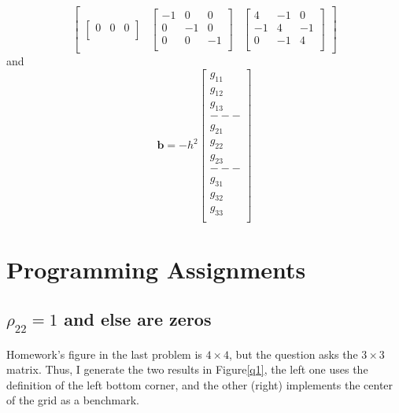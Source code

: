 \documentclass[12pt]{article}
\begin{document}
\[\begin{bmatrix}
\begin{bmatrix}
                0 & 0 & 0\\
            \end{bmatrix}
            &
            \begin{bmatrix}
                -1 & 0  & 0 \\
                0  & -1 & 0 \\
                0  & 0  & -1\\
            \end{bmatrix}
            &
            \begin{bmatrix}
                4  & -1 & 0 \\
                -1 & 4  & -1\\
                0  & -1 & 4 \\
            \end{bmatrix}
        \end{bmatrix}
    \]
    and 
    \[
        \mathbf{b} = -h^{2}
        \begin{bmatrix}
            g_{11}\\
            g_{12}\\
            g_{13}\\
            ---\\
            g_{21}\\
            g_{22}\\
            g_{23}\\
            ---\\
            g_{31}\\
            g_{32}\\
            g_{33}\\
        \end{bmatrix}
    \]

    \section{Programming Assignments}
    \subsection{$\rho_{22} = 1$ and else are zeros}
    Homework's figure in the last problem is $4 \times 4$, but the question asks the $3 \times 3$ matrix. Thus, I generate the two results in Figure\ref{q1}, the left one uses the definition of the left bottom corner, and the other (right) implements the center of the grid as a benchmark.
\end{document}
